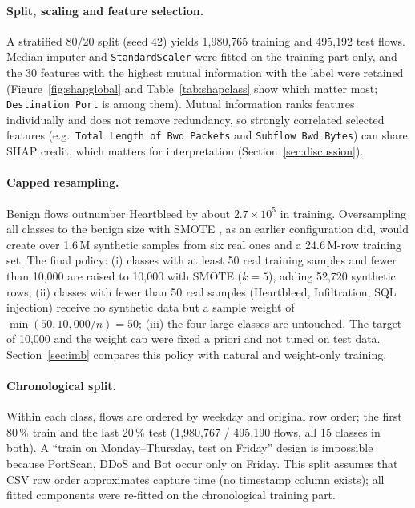 \documentclass[11pt,a4paper]{article}
\newcommand{\feat}[1]{\texttt{#1}}
\begin{document}
\paragraph{Split, scaling and feature selection.} A stratified 80/20 split (seed 42) yields 1{,}980{,}765 training and 495{,}192 test flows. Median imputer and \texttt{StandardScaler} were fitted on the training part only, and the 30 features with the highest mutual information with the label \parencite{pedregosa2011} were retained (Figure~\ref{fig:shapglobal} and Table~\ref{tab:shapclass} show which matter most; \feat{Destination Port} is among them). Mutual information ranks features individually and does not remove redundancy, so strongly correlated selected features (e.g.\ \feat{Total Length of Bwd Packets} and \feat{Subflow Bwd Bytes}) can share SHAP credit, which matters for interpretation (Section~\ref{sec:discussion}).

\paragraph{Capped resampling.} Benign flows outnumber Heartbleed by about $2.7\times10^5$ in training. Oversampling all classes to the benign size with SMOTE \parencite{chawla2002,lemaitre2017}, as an earlier configuration did, would create over 1.6\,M synthetic samples from six real ones and a 24.6\,M-row training set. The final policy: (i) classes with at least 50 real training samples and fewer than 10{,}000 are raised to 10{,}000 with SMOTE ($k=5$), adding 52{,}720 synthetic rows; (ii) classes with fewer than 50 real samples (Heartbleed, Infiltration, SQL injection) receive no synthetic data but a sample weight of $\min(50,10{,}000/n)=50$; (iii) the four large classes are untouched. The target of 10{,}000 and the weight cap were fixed a priori and not tuned on test data. Section~\ref{sec:imb} compares this policy with natural and weight-only training.

\paragraph{Chronological split.} Within each class, flows are ordered by weekday and original row order; the first 80\,\% train and the last 20\,\% test (1{,}980{,}767 / 495{,}190 flows, all 15 classes in both). A ``train on Monday--Thursday, test on Friday'' design is impossible because PortScan, DDoS and Bot occur only on Friday. This split assumes that CSV row order approximates capture time (no timestamp column exists); all fitted components were re-fitted on the chronological training part.
\end{document}
